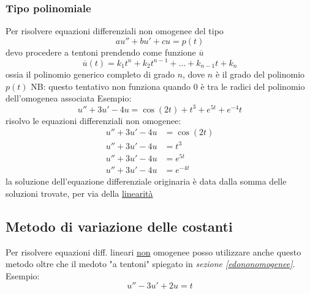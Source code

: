 \subsubsection*{Tipo polinomiale}
Per risolvere equazioni differenziali non omogenee del tipo
\[
	au''+ bu' + cu = p\left( t \right)
\]
devo procedere a tentoni prendendo come funzione $ \overline{u} $
\[
	\overline{u}\left( t \right) = k_1t ^{n}+ k_2 t ^{n-1}+\ldots+k_{n-1}t+ k_n
\]
ossia il polinomio generico completo di grado $ n $, dove $ n $ è il grado del polinomio $ p\left( t \right)  $
\vskip3mm
NB: questo tentativo non funziona quando $ 0 $ è tra le radici del polinomio dell'omogenea associata
\hr
{}
Esempio:
\[
	u'' + 3u' - 4u = \cos \left( 2t \right) + t^3 + e^{5t}+ e^{-4}t
\]
risolvo le equazioni differenziali non omogenee:
\begin{align*}
	u'' + 3u' - 4u & =  \cos \left( 2t \right) \\
	u'' + 3u' - 4u & = t^3                     \\
	u'' + 3u' - 4u & =  e^{5t}                 \\
	u'' + 3u' - 4u & =  e^{-4t}
\end{align*}
la soluzione dell'equazione differenziale originaria è data dalla somma delle soluzioni trovate, per via della \underline{linearità}
\subsection{Metodo di variazione delle costanti}
Per risolvere equazioni diff. lineari \underline{non} omogenee posso utilizzare anche questo metodo oltre che il medoto "a tentoni" spiegato in \textit{sezione \ref{edononomogenee}}. Esempio:
\[
	u''-3u' + 2u =t
\]
